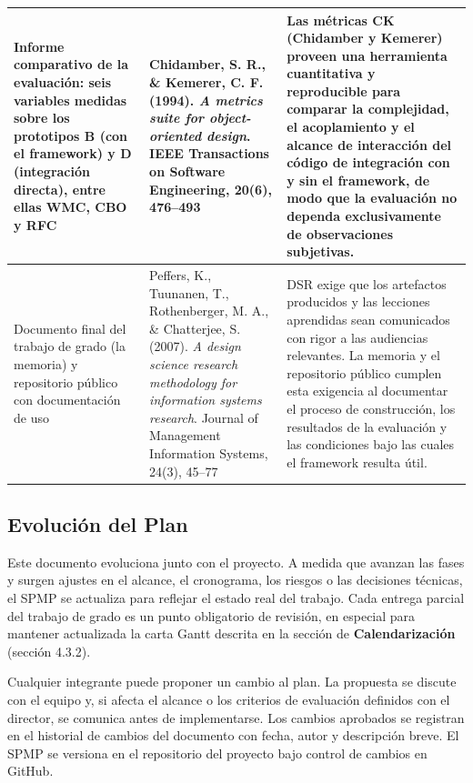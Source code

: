 \begin{center}
\begin{longtable}{|P{0.227}|P{0.229}|P{0.519}|}
  \hline
  Informe comparativo de la evaluación: seis variables medidas sobre los prototipos B (con el framework) y D (integración directa), entre ellas WMC, CBO y RFC & Chidamber, S. R., \& Kemerer, C. F. (1994). \textit{A metrics suite for object-oriented design}. IEEE Transactions on Software Engineering, 20(6), 476--493 & Las métricas CK (Chidamber y Kemerer) proveen una herramienta cuantitativa y reproducible para comparar la complejidad, el acoplamiento y el alcance de interacción del código de integración con y sin el framework, de modo que la evaluación no dependa exclusivamente de observaciones subjetivas. \\
  \hline
  Documento final del trabajo de grado (la memoria) y repositorio público con documentación de uso & Peffers, K., Tuunanen, T., Rothenberger, M. A., \& Chatterjee, S. (2007). \textit{A design science research methodology for information systems research}. Journal of Management Information Systems, 24(3), 45--77 & DSR exige que los artefactos producidos y las lecciones aprendidas sean comunicados con rigor a las audiencias relevantes. La memoria y el repositorio público cumplen esta exigencia al documentar el proceso de construcción, los resultados de la evaluación y las condiciones bajo las cuales el framework resulta útil. \\
  \hline
\end{longtable}
\end{center}

\subsection{Evolución del Plan}

Este documento evoluciona junto con el proyecto. A medida que avanzan las fases y surgen ajustes en el alcance, el cronograma, los riesgos o las decisiones técnicas, el SPMP se actualiza para reflejar el estado real del trabajo. Cada entrega parcial del trabajo de grado es un punto obligatorio de revisión, en especial para mantener actualizada la carta Gantt descrita en la sección de \textbf{Calendarización} (sección 4.3.2).

Cualquier integrante puede proponer un cambio al plan. La propuesta se discute con el equipo y, si afecta el alcance o los criterios de evaluación definidos con el director, se comunica antes de implementarse. Los cambios aprobados se registran en el historial de cambios del documento con fecha, autor y descripción breve. El SPMP se versiona en el repositorio del proyecto bajo control de cambios en GitHub.

